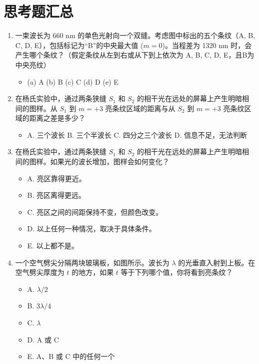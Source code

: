 \documentclass[UTF8]{ctexart}
\begin{document}
\section*{思考题汇总}
\begin{enumerate}[label=\textbf{Q\arabic*.}, leftmargin=*]
    \item 一束波长为 660 nm 的单色光射向一个双缝。考虑图中标出的五个条纹（A, B, C, D, E），包括标记为“B”的中央最大值 ($m=0$)。当程差为 1320 nm 时，会产生哪个条纹？（假定条纹从左到右或从下到上依次为 A, B, C, D, E，且B为中央亮纹）
        \begin{itemize}
            \item[] (a) A (b) B (c) C (d) D (e) E
        \end{itemize}

    \item 在杨氏实验中，通过两条狭缝 $S_1$ 和 $S_2$ 的相干光在远处的屏幕上产生明暗相间的图样。从 $S_1$ 到 $m=+3$ 亮条纹区域的距离与从 $S_2$ 到 $m=+3$ 亮条纹区域的距离之差是多少？
        \begin{itemize}
            \item[] A. 三个波长 B. 三个半波长 C. 四分之三个波长 D. 信息不足，无法判断
        \end{itemize}

    \item 在杨氏实验中，通过两条狭缝 $S_1$ 和 $S_2$ 的相干光在远处的屏幕上产生明暗相间的图样。如果光的波长增加，图样会如何变化？
        \begin{itemize}
            \item[] A. 亮区靠得更近。
            \item[] B. 亮区离得更远。
            \item[] C. 亮区之间的间距保持不变，但颜色改变。
            \item[] D. 以上任何一种情况，取决于具体条件。
            \item[] E. 以上都不是。
        \end{itemize}

    \item 一个空气劈尖分隔两块玻璃板，如图所示。波长为 $\lambda$ 的光垂直入射到上板。在空气劈尖厚度为 $t$ 的地方，如果 $t$ 等于下列哪个值，你将看到亮条纹？
        \begin{itemize}
            \item[] Α. $\lambda/2$
            \item[] Β. $3\lambda/4$
            \item[] C. $\lambda$
            \item[] D. A 或 C
            \item[] E. A、B 或 C 中的任何一个
        \end{itemize}
\end{enumerate}
\end{document}
